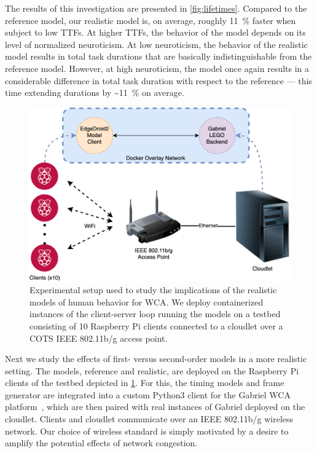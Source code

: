 The results of this investigation are presented in \cref{fig:lifetimes}.
Compared to the reference model, our realistic model is, on average, roughly \SI{11}{\percent} faster when subject to low \acp{TTF}.
At higher \acp{TTF}, the behavior of the model depends on its level of normalized neuroticism.
At low neuroticism, the behavior of the realistic model results in total task durations that are basically indistinguishable from the reference model.
However, at high neuroticism, the model once again results in a considerable difference in total task duration with respect to the reference --- this time extending durations by \textasciitilde\SI{11}{\percent} on average.

\begin{figure}
    \centering
    \includegraphics[width=\columnwidth]{figs/EdgeDroid2ExperimentalSetup.png}
    \caption{%
        Experimental setup used to study the implications of the realistic models of human behavior for \ac{WCA}.
        We deploy containerized instances of the client-server loop running the models on a testbed consisting of \num{10} Raspberry Pi clients connected to a cloudlet over a \acs*{COTS} \acs{IEEE} \num{802.11}b/g access point.
    }\label{fig:expsetup}
\end{figure}

Next we study the effects of first- versus second-order models in a more realistic setting.
The models, reference and realistic, are deployed on the Raspberry Pi clients of the testbed depicted in \cref{fig:expsetup}.
For this, the timing models and frame generator are integrated into a custom Python3 client for the Gabriel \ac{WCA} platform~\cite{Chen2018application}, which are then paired with real instances of Gabriel deployed on the cloudlet.
Clients and cloudlet communicate over an \acs{IEEE} \num{802.11}b/g wireless network.
Our choice of wireless standard is simply motivated by a desire to amplify the potential effects of network congestion.

